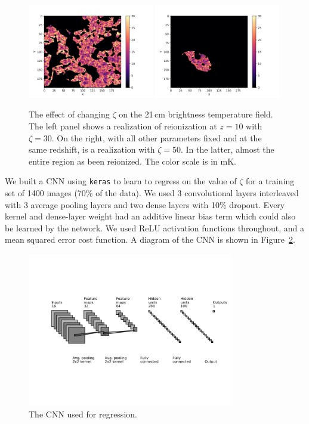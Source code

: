 \begin{figure}
\centering
\includegraphics[width=0.49\textwidth]{chapters/hera_ml/figures/zeta30.png}
\includegraphics[width=0.49\textwidth]{chapters/hera_ml/figures/zeta50.png}
\caption[The effect of changing $\zeta$ on the 21\,cm brightness temperature field.]{The effect of changing $\zeta$ on the 21\,cm brightness temperature field. The left panel shows a realization of reionization at $z=10$ with $\zeta=30$. On the right, with all other parameters fixed and at the same redshift, is a realization with $\zeta=50$. In the latter, almost the entire region as been reionized. The color scale is in mK.}
\label{fig:zeta-30-50}
\end{figure}

We built a CNN using {\tt keras} \citep{keras} to learn to regress on the value of $\zeta$ for a training set of 1400 images (70\% of the data). We used 3 convolutional layers interleaved with 3 average pooling layers and two dense layers with 10\% dropout. Every kernel and dense-layer weight had an additive linear bias term which could also be learned by the network. We used ReLU activation functions throughout, and a mean squared error cost function. A diagram of the CNN is shown in Figure~\ref{fig:my-cnn}.

\begin{figure}
\centering
\includegraphics[width=0.8\textwidth]{chapters/hera_ml/figures/my-cnn.png}
\caption{The CNN used for regression.}
\label{fig:my-cnn}
\end{figure}

